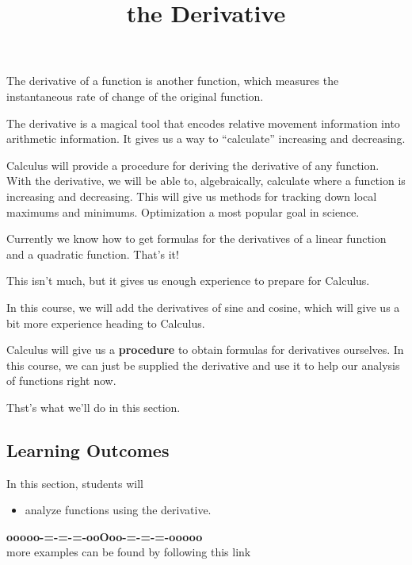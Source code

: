 \documentclass{ximera}
\title{the Derivative}
\begin{document}
\begin{abstract}
%
\end{abstract}
\maketitle


The derivative of a function is another function, which measures the instantaneous rate of change of the original function.


The derivative is a magical tool that encodes relative movement information into arithmetic information. It gives us a way to ``calculate'' increasing and decreasing. 


Calculus will provide a procedure for deriving the derivative of any function.  With the derivative, we will be able to, algebraically, calculate where a function is increasing and decreasing.  This will give us methods for tracking down local maximums and minimums. Optimization a most popular goal in science.


Currently we know how to get formulas for the derivatives of a linear function and a quadratic function.  That's it! 

This isn't much, but it gives us enough experience to prepare for Calculus.


In this course, we will add the derivatives of sine and cosine, which will give us a bit more experience heading to Calculus.


Calculus will give us a \textbf{\textcolor{blue!55!black}{procedure}} to obtain formulas for derivatives ourselves.  In this course, we can just be supplied the derivative and use it to help our analysis of functions right now.


Thst's what we'll do in this section.






\subsection*{Learning Outcomes}


\begin{sectionOutcomes}
In this section, students will 

\begin{itemize}
\item analyze functions using the derivative.
\end{itemize}
\end{sectionOutcomes}














\begin{center}
\textbf{\textcolor{green!50!black}{ooooo-=-=-=-ooOoo-=-=-=-ooooo}} \\

more examples can be found by following this link\\ 

\end{center}
\end{document}
